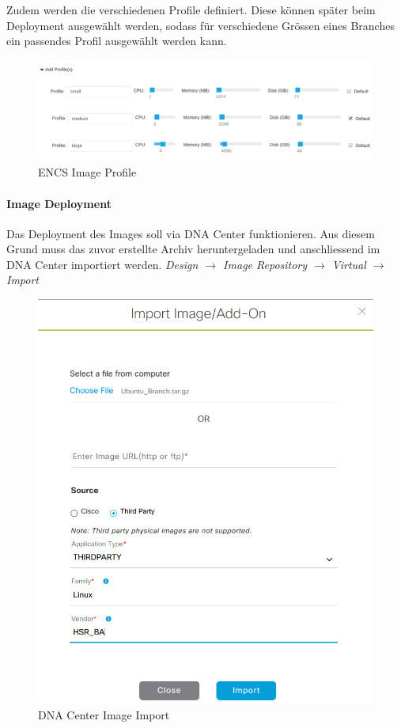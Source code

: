 Zudem werden die verschiedenen Profile definiert. Diese können später beim Deployment ausgewählt werden, sodass für verschiedene Grössen eines Branches ein passendes Profil ausgewählt werden kann.

\begin{figure}[H]
	\centering
	\includegraphics[width=0.8\linewidth]{img/Absicherung/ENCS-Image-Profile.png}
	\caption{ENCS Image Profile}
	\label{fig:ENCS Image Profile}
\end{figure}

\paragraph{Image Deployment}

Das Deployment des Images soll via DNA Center funktionieren. Aus diesem Grund muss das zuvor erstellte Archiv heruntergeladen und anschliessend im DNA Center importiert werden. \textit{Design $\rightarrow$ Image Repository $\rightarrow$ Virtual $\rightarrow$ Import}

\begin{figure}[H]
	\centering
	\includegraphics[width=0.6\linewidth]{img/Absicherung/DNA-Center-Image-Import.png}
	\caption{DNA Center Image Import}
	\label{fig:DNA Center Image Import}
\end{figure}

